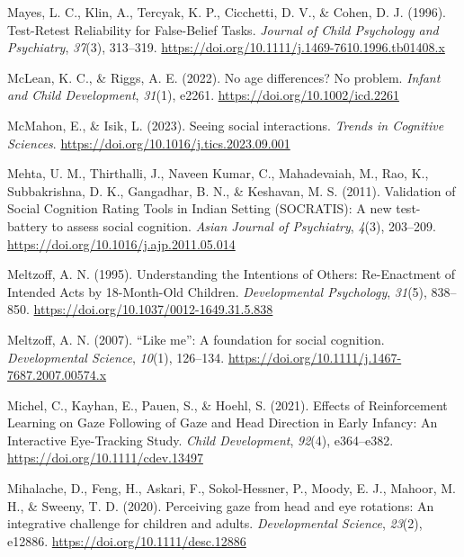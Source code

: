 \documentclass[
]{scrbook}
\newlength{\cslhangindent}
\newenvironment{CSLReferences}[2] %
 {\begin{list}{}{%
  \setlength{\itemindent}{0pt}
  \setlength{\leftmargin}{0pt}
  \setlength{\parsep}{0pt}
  \ifodd #1
   \setlength{\leftmargin}{\cslhangindent}
   \setlength{\itemindent}{-1\cslhangindent}
  \fi
  \setlength{\itemsep}{#2\baselineskip}}}
 {\end{list}}
\begin{document}
\begin{CSLReferences}{1}{0}
Mayes, L. C., Klin, A., Tercyak, K. P., Cicchetti, D. V., \& Cohen, D. J. (1996). Test-{Retest Reliability} for {False-Belief Tasks}. \emph{Journal of Child Psychology and Psychiatry}, \emph{37}(3), 313--319. \url{https://doi.org/10.1111/j.1469-7610.1996.tb01408.x}

McLean, K. C., \& Riggs, A. E. (2022). No age differences? {No} problem. \emph{Infant and Child Development}, \emph{31}(1), e2261. \url{https://doi.org/10.1002/icd.2261}

McMahon, E., \& Isik, L. (2023). Seeing social interactions. \emph{Trends in Cognitive Sciences}. \url{https://doi.org/10.1016/j.tics.2023.09.001}

Mehta, U. M., Thirthalli, J., Naveen Kumar, C., Mahadevaiah, M., Rao, K., Subbakrishna, D. K., Gangadhar, B. N., \& Keshavan, M. S. (2011). Validation of {Social Cognition Rating Tools} in {Indian Setting} ({SOCRATIS}): {A} new test-battery to assess social cognition. \emph{Asian Journal of Psychiatry}, \emph{4}(3), 203--209. \url{https://doi.org/10.1016/j.ajp.2011.05.014}

Meltzoff, A. N. (1995). Understanding the {Intentions} of {Others}: {Re-Enactment} of {Intended Acts} by 18-{Month-Old Children}. \emph{Developmental Psychology}, \emph{31}(5), 838--850. \url{https://doi.org/10.1037/0012-1649.31.5.838}

Meltzoff, A. N. (2007). {``{Like} me''}: A foundation for social cognition. \emph{Developmental Science}, \emph{10}(1), 126--134. \url{https://doi.org/10.1111/j.1467-7687.2007.00574.x}

Michel, C., Kayhan, E., Pauen, S., \& Hoehl, S. (2021). Effects of {Reinforcement Learning} on {Gaze Following} of {Gaze} and {Head Direction} in {Early Infancy}: {An Interactive Eye-Tracking Study}. \emph{Child Development}, \emph{92}(4), e364--e382. \url{https://doi.org/10.1111/cdev.13497}

Mihalache, D., Feng, H., Askari, F., Sokol-Hessner, P., Moody, E. J., Mahoor, M. H., \& Sweeny, T. D. (2020). Perceiving gaze from head and eye rotations: {An} integrative challenge for children and adults. \emph{Developmental Science}, \emph{23}(2), e12886. \url{https://doi.org/10.1111/desc.12886}


\end{CSLReferences}
\end{document}
